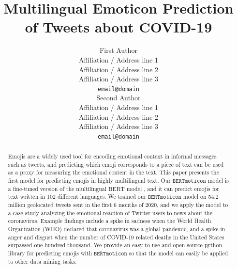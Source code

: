 \documentclass[11pt]{article}
\title{Multilingual Emoticon Prediction of Tweets about COVID-19 \emoji{mask_photo.png} }
\author{First Author \\
  Affiliation / Address line 1 \\
  Affiliation / Address line 2 \\
  Affiliation / Address line 3 \\
  {\tt email@domain} \\\And
  Second Author \\
  Affiliation / Address line 1 \\
  Affiliation / Address line 2 \\
  Affiliation / Address line 3 \\
  {\tt email@domain} \\}
\date{}
\newcommand{\bertmoji}{\texttt{BERTmoticon}}
\newcommand{\bert}{\text{multilingual BERT}}
\begin{document}
\maketitle
\begin{abstract}
    Emojis are a widely used tool for encoding emotional content in informal messages such as tweets,
    and predicting which emoji corresponds to a piece of text can be used as a proxy for measuring the emotional content in the text.
    This paper presents the first model for predicting emojis in highly multilingual text.
    Our $\bertmoji$ model is a fine-tuned version of the $\bert$ model \citep{devlin2018bert},
    and it can predict emojis for text written in 102 different languages.
    We trained our $\bertmoji$ model on 54.2 million geolocated tweets sent in the first 6 months of 2020,
    and we apply the model to a case study analyzing the emotional reaction of Twitter users to news about the coronavirus.
    Example findings include a spike in sadness when the World Health Organization (WHO) declared that coronavirus was a global pandemic,
    and a spike in anger and disgust when the number of COVID-19 related deaths in the United States surpassed one hundred thousand.
    We provide an easy-to-use and open source python library for predicting emojis with $\bertmoji$ so that the model can easily be applied to other data mining tasks.
\end{abstract}

%
% 
\end{document}
